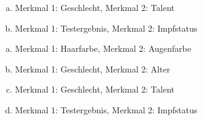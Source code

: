 \begin{exercise}
\begin{enumerate}[a)]
      \item Merkmal 1: Geschlecht, Merkmal 2: Talent
      \item Merkmal 1: Testergebnis, Merkmal 2: Impfstatus
        \begin{center}
          \begin{fourfoldtable}
          \end{fourfoldtable}%
          \hspace{3em}%
          \begin{fourfoldtable}
          \end{fourfoldtable}%
        \end{center}
    \end{enumerate}
  \fi
  \ifoutcome\outcome
    \begin{enumerate}[a)]
      \item Merkmal 1: Haarfarbe, Merkmal 2: Augenfarbe
      \item Merkmal 1: Geschlecht, Merkmal 2: Alter
        \begin{center}
          \begin{fourfoldtable}
          \end{fourfoldtable}%
          \hspace{3em}%
          \begin{fourfoldtable}%
          \end{fourfoldtable}%
        \end{center}\medskip
      \item Merkmal 1: Geschlecht, Merkmal 2: Talent
      \item Merkmal 1: Testergebnis, Merkmal 2: Impfstatus
        \begin{center}
          \begin{fourfoldtable}

\end{fourfoldtable}
\end{center}
\end{enumerate}
\end{exercise}
